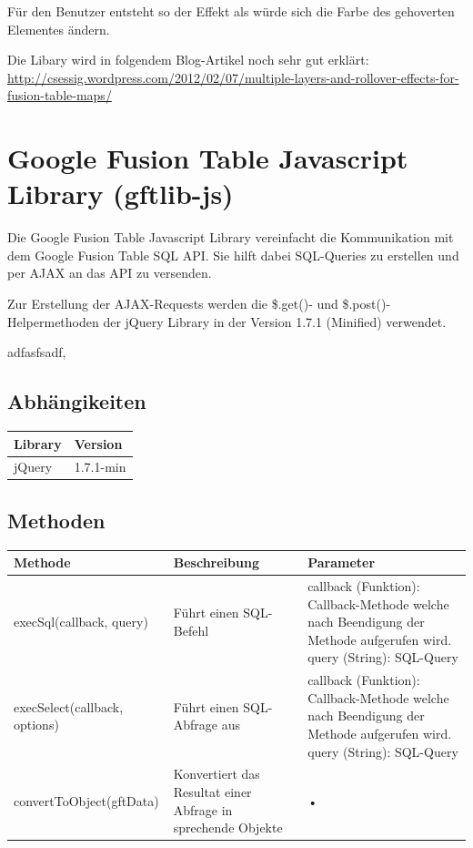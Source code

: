 Für den Benutzer entsteht so der Effekt als würde sich die Farbe des gehoverten Elementes ändern.

Die Libary wird in folgendem Blog-Artikel noch sehr gut erklärt: \url{http://csessig.wordpress.com/2012/02/07/multiple-layers-and-rollover-effects-for-fusion-table-maps/}

\section{Google Fusion Table Javascript Library (gftlib-js)}
\label{gftlib-js}
Die Google Fusion Table Javascript Library vereinfacht die Kommunikation mit dem Google Fusion Table SQL API. Sie hilft dabei SQL-Queries zu erstellen und per AJAX an das API zu versenden.

Zur Erstellung der AJAX-Requests werden die \$.get()- und \$.post()-Helpermethoden der jQuery Library in der Version 1.7.1 (Minified) verwendet.

adfasfsadf,

\subsection{Abhängikeiten}
\begin{longtable}{|l|l|}
\hline 
\textbf{Library} & \textbf{Version} \\ 
\hline 
jQuery & 1.7.1-min \\ 
\hline 
\end{longtable} 

\subsection{Methoden}
\begin{longtable}{|l|p{5cm}|p{5cm}|}
\hline 
\textbf{Methode} & \textbf{Beschreibung} & \textbf{Parameter} \\ 
\hline 
execSql(callback, query) & Führt einen SQL-Befehl & callback (Funktion): Callback-Methode welche nach Beendigung der Methode aufgerufen wird. query (String): SQL-Query \\ 
\hline 
execSelect(callback, options) & Führt einen SQL-Abfrage aus & callback (Funktion): Callback-Methode welche nach Beendigung der Methode aufgerufen wird. query (String): SQL-Query \\ 
\hline 
convertToObject(gftData) & Konvertiert das Resultat einer Abfrage in sprechende Objekte & • \\ 
\hline 
\end{longtable} 
